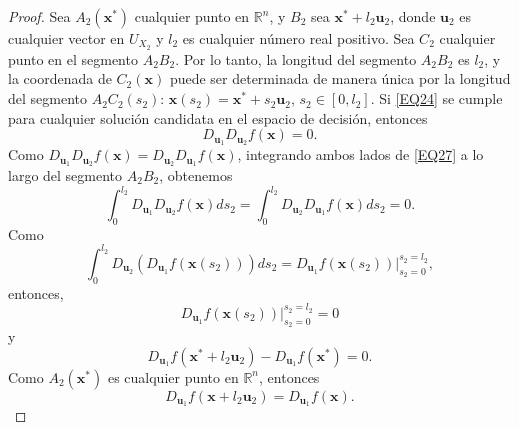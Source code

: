 \begin{proof}
Sea \( A_2 (\mathbf{x}^*) \) cualquier punto en \( \mathbb{R}^n \), y \( B_2 \) sea \( \mathbf{x}^* + l_2 \mathbf{u}_2 \), donde \( \mathbf{u}_2 \) es cualquier vector en \( U_{X_2} \) y \( l_2 \) es cualquier número real positivo. Sea \( C_2 \) cualquier punto en el segmento \( A_2 B_2 \). Por lo tanto, la longitud del segmento \( A_2 B_2 \) es \( l_2 \), y la coordenada de \( C_2 (\mathbf{x}) \) puede ser determinada de manera única por la longitud del segmento \( A_2 C_2 (s_2) \): \( \mathbf{x}(s_2) = \mathbf{x}^* + s_2 \mathbf{u}_2 \), \( s_2 \in [0, l_2] \). Si \eqref{EQ24} se cumple para cualquier solución candidata en el espacio de decisión, entonces
\begin{equation}
D_{\mathbf{u}_1} D_{\mathbf{u}_2} f(\mathbf{x}) = 0.
\label{EQ27}
\end{equation}
Como \( D_{\mathbf{u}_1} D_{\mathbf{u}_2} f(\mathbf{x}) = D_{\mathbf{u}_2} D_{\mathbf{u}_1} f(\mathbf{x}) \), integrando ambos lados de \eqref{EQ27} a lo largo del segmento \( A_2 B_2 \), obtenemos
\begin{equation}
\int_0^{l_2} D_{\mathbf{u}_1} D_{\mathbf{u}_2} f(\mathbf{x}) ds_2 = \int_0^{l_2} D_{\mathbf{u}_2} D_{\mathbf{u}_1} f(\mathbf{x}) ds_2 = 0.
\label{EQ28}
\end{equation}
Como
\begin{equation}
\int_0^{l_2} D_{\mathbf{u}_2} (D_{\mathbf{u}_1} f(\mathbf{x}(s_2))) ds_2 = D_{\mathbf{u}_1} f(\mathbf{x}(s_2)) \big|_{s_2=0}^{s_2=l_2},
\label{EQ29}
\end{equation}
entonces,
\begin{equation}
D_{\mathbf{u}_1} f(\mathbf{x}(s_2)) \big|_{s_2=0}^{s_2=l_2} = 0
\label{EQ30}
\end{equation}
y
\begin{equation}
D_{\mathbf{u}_1} f(\mathbf{x}^* + l_2 \mathbf{u}_2) - D_{\mathbf{u}_1} f(\mathbf{x}^*) = 0.
\label{EQ31}
\end{equation}
Como \( A_2 (\mathbf{x}^*) \) es cualquier punto en \( \mathbb{R}^n \), entonces
\begin{equation}
D_{\mathbf{u}_1} f(\mathbf{x} + l_2 \mathbf{u}_2) = D_{\mathbf{u}_1} f(\mathbf{x}).
\label{EQ32}
\end{equation}


\end{proof}
